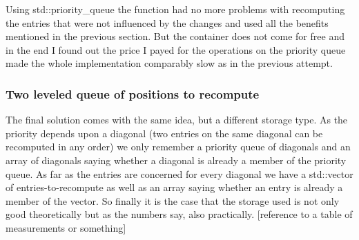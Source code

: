 Using std::priority\_queue the function had no more problems with recomputing the entries that were not influenced by the changes and used all the benefits mentioned in the previous section. But the container does not come for free and in the end I found out the price I payed for the operations on the priority queue made the whole implementation comparably slow as in the previous attempt.
\subsubsection{Two leveled queue of positions to recompute}
The final solution comes with the same idea, but a different storage type. As the priority depends upon a diagonal (two entries on the same diagonal can be recomputed in any order) we only remember a priority queue of diagonals and an array of diagonals saying whether a diagonal is already a member of the priority queue. As far as the entries are concerned for every diagonal we have a std::vector of entries-to-recompute as well as an array saying whether an entry is already a member of the vector. So finally it is the case that the storage used is not only good theoretically but as the numbers say, also practically. [reference to a table of measurements or something]